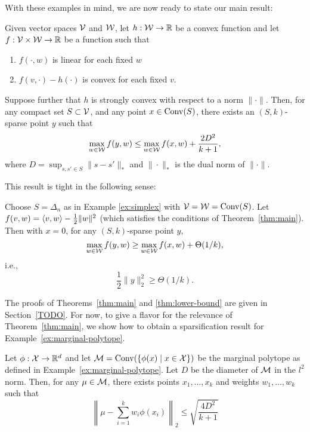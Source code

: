 \documentclass[paper.tex]{subfiles}
\begin{document}
With these examples in mind, we are now ready to state our main result:
\begin{theorem}
\label{thm:main}
Given vector spaces $\mathcal{V}$ and $\mathcal{W}$, let $h : \mathcal{W} \to \mathbb R$ be a convex function and let $f : \mathcal{V} \times \mathcal{W} \to \mathbb R$ be a function 
such that
\begin{enumerate}
\item $f(\cdot,w)$ is linear for each fixed $w$
\item $f(v, \cdot) - h(\cdot)$ is convex for each fixed $v$.
\end{enumerate}
Suppose further that $h$ is strongly convex with respect to a norm $\|\cdot\|$. 
Then, for any compact set $S \subset \mathcal{V}$, and any point $x \in \operatorname{Conv}(S)$, 
there exists an $(S,k)$-sparse point $y$ such that 
\[ \max_{w \in \mathcal{W}} f(y,w) \leq \max_{w \in \mathcal{W}} f(x,w) + \frac{2D^2}{k+1}, \]
where $D = \sup_{s, s' \in S} \|s-s'\|_*$ and $\|\cdot\|_*$ is the dual norm 
of $\|\cdot\|$.
\end{theorem}
This result is tight in the following sense:
\begin{theorem}
\label{thm:lower-bound}
Choose $S = \Delta_{n}$ as in Example \ref{ex:simplex} with $\mathcal{V} = \mathcal{W} = \operatorname{Conv}(S)$. Let $f(v,w) = \left\langle v, w \right\rangle - \frac{1}{2}\|w\|^{2}$ (which satisfies the conditions of Theorem~\ref{thm:main}). Then with $x = 0$, for any 
$(S,k)$-sparse point $y$, 
\[ \max_{w \in \mathcal{W}} f(y,w) \ge \max_{w \in \mathcal{W}} f(x,w) + \Theta(1/k), \]
i.e.,
\[ \frac{1}{2}\|y\|_{2}^{2} \ge \Theta(1/k). \]
\end{theorem}
The proofs of Theorems~\ref{thm:main} and \ref{thm:lower-bound} are given in Section~\ref{TODO}. For now, 
to give a flavor for the relevance of Theorem~\ref{thm:main}, we show how 
to obtain a sparsification result for Example~\ref{ex:marginal-polytope}.
\begin{proposition}
\label{prop:pseudosamples}
Let $\phi : \mathcal{X} \to \mathbb R^d$ and let $\mathcal{M} = \operatorname{Conv}(\{\phi(x) \mid x \in \mathcal{X}\})$ 
be the marginal polytope as defined in Example~\ref{ex:marginal-polytope}. 
Let $D$ be the diameter of $\mathcal{M}$ in the $l^2$ norm. Then, for any 
$\mu \in \mathcal{M}$, there exists points $x_1,\ldots,x_k$ and weights 
$w_1,\ldots,w_k$ such that
\[ \left\|\mu - \sum_{i=1}^k w_i \phi(x_i)\right\|_2 \leq \sqrt{\frac{4D^2}{k+1}} \]
\end{proposition}
\end{document}
